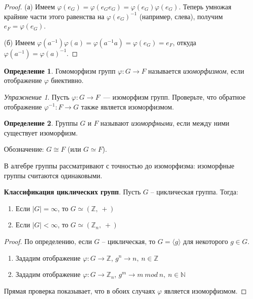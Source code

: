\documentclass[a4paper, 12pt]{article}
\def\ZZ{{\mathbb Z}}%
\def\NN{{\mathbb N}}%
\theoremstyle{definition}
\newtheorem{definition}{Определение}
\theoremstyle{remark}
\newtheorem{exc}{Упражнение}
\begin{document}
\vspace{-5mm}

\begin{proof}
(а) Имеем $\varphi(e_G)=\varphi(e_Ge_G)=\varphi(e_G)\varphi(e_G)$.
Теперь умножая крайние части этого равенства на $\varphi(e_G)^{-1}$
(например, слева), получим $e_F = \varphi(e_G)$.

(б) Имеем $\varphi(a^{-1}) \varphi(a) = \varphi(a^{-1}a) =
\varphi(e_G) = e_F$, откуда $\varphi(a^{-1}) = \varphi(a)^{-1}$.
\end{proof}

\begin{definition}
Гомоморфизм групп $\varphi\colon G\to F$ называется {\it
изоморфизмом}, если отображение $\varphi$ биективно.
\end{definition}

\begin{exc}
Пусть $\varphi\colon G\to F$~--- изоморфизм групп. 
Проверьте, что
обратное отображение $\varphi^{-1}\colon F \to G$ также является
изоморфизмом.
\end{exc}

\begin{definition}
Группы $G$ и $F$ называют {\it изоморфными}, если между ними
существует изоморфизм.

Обозначение: $G\cong F$ (или $G \simeq F$).
\end{definition}

В алгебре группы рассматривают с точностью до изоморфизма:
изоморфные группы считаются \guillemotleft
одинаковыми\guillemotright{}.

{\bf Классификация циклических групп}. Пусть $G$ -- циклическая группа. Тогда:
\begin{enumerate}
    \item Если $|G| = \infty$, то $G \simeq (\ZZ,\ +)$
    \item Если $|G| < \infty$, то $G \simeq (\ZZ_n,\ +)$
\end{enumerate}
\begin{proof}
    По определению, если $G$ -- циклическая, то $G = \langle g \rangle$ для некоторого $g \in G$.
    \begin{enumerate}
        \item Зададим отображение $\varphi \colon G \to \ZZ$, $g^n \to n,\ n \in \ZZ$
        \item Зададим отображение $\varphi \colon G \to \ZZ_n$, $g^m \to m\ mod\ n,\ n \in \NN$
    \end{enumerate}
    Прямая проверка показывает, что в обоих случаях $\varphi$ является изоморфизмом.
\end{proof}
\end{document}
